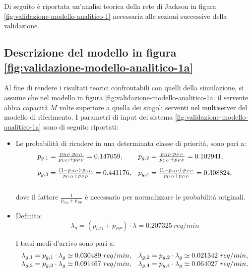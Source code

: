 Di seguito è riportata un'analisi teorica della rete di Jackson in figura \ref{fig:validazione-modello-analitico-1} necessaria alle sezioni successive della validazione.


\subsection{Descrizione del modello in figura \ref{fig:validazione-modello-analitico-1a}}
Al fine di rendere i risultati teorici confrontabili con quelli della simulazione, si assume che nel modello in figura \ref{fig:validazione-modello-analitico-1a} il servente abbia capacità $M$ volte superiore a quella dei singoli serventi nel multiserver del modello di riferimento.
\newpage
I parametri di input del sistema \ref{fig:validazione-modello-analitico-1a} sono di seguito riportati:
\begin{itemize}
\item Le probabilità di ricadere in una determinata classe di priorità, sono pari a:
\begin{equation}
\begin{array}{l l}
p_{g,1} = \frac{p_{BP} \cdot p_{UO}}{p_{UO} + p_{PP}} = 0.147059, & p_{g,2} = \frac{p_{BP} \cdot p_{PP}}{p_{UO} + p_{PP}} = 0.102941, \\[1em]
p_{g,3} = \frac{(1-p_{BP}) \cdot p_{UO}}{p_{UO} + p_{PP}} = 0.441176, & p_{g,4} = \frac{(1-p_{BP}) \cdot p_{PP}}{p_{UO} + p_{PP}} = 0.308824, \\[1.5em]
\end{array}
\end{equation}
dove il fattore $\frac{1}{p_{UO} + p_{PP}}$ è necessario per normalizzare le probabilità originali.

\item Definito:
\begin{equation}
\lambda_g = (p_{UO} + p_{PP})\cdot \lambda = 0.207325\ req/min
\end{equation} 

I tassi medi d'arrivo sono pari a:
\begin{equation}
\begin{array}{l l}
\lambda_{g,1} = p_{g,1} \cdot \lambda_g \simeq 0.030489\ req/min, & \lambda_{g,2} = p_{g,2} \cdot \lambda_g \simeq 0.021342\ req/min, \\
\lambda_{g,3} = p_{g,3} \cdot \lambda_g \simeq 0.091467\ req/min, & \lambda_{g,4} = p_{g,4} \cdot \lambda_g \simeq 0.064027\ req/min, \\[1em]
\end{array}
\end{equation}


\end{itemize}

